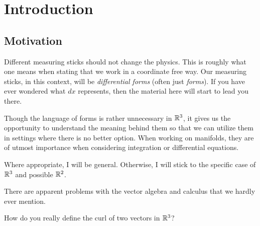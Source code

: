 
\section{Introduction}

\subsection{Motivation}
Different measuring sticks should not change the physics.  This is roughly what one means when stating that we work in a coordinate free way.  Our measuring sticks, in this context, will be \emph{differential forms} (often just \emph{forms}). If you have ever wondered what $dx$ represents, then the material here will start to lead you there. 

Though the language of forms is rather unnecessary in $\mathbb{R}^3$, it gives us the opportunity to understand the meaning behind them so that we can utilize them in settings where there is no better option.  When working on manifolds, they are of utmost importance when considering integration or differential equations.  

Where appropriate, I will be general.  Otherwise, I will stick to the specific case of $\mathbb{R}^3$ and possible $\mathbb{R}^2$.

There are apparent problems with the vector algebra and calculus that we hardly ever mention.  
\begin{question}
    How do you really define the curl of two vectors in $\mathbb{R}^3$?
\end{question}

